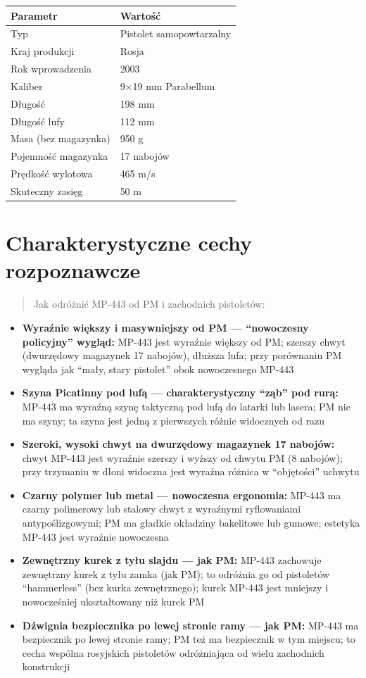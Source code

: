 \documentclass[12pt,openany,oneside]{book}
\providecommand{\tightlist}{%
  \setlength{\itemsep}{0pt}\setlength{\parskip}{0pt}}
\begin{document}
\begin{longtable}[]{@{}ll@{}}
\toprule\noalign{}
Parametr & Wartość \\
\midrule\noalign{}
\endhead
\bottomrule\noalign{}
\endlastfoot
Typ & Pistolet samopowtarzalny \\
Kraj produkcji & Rosja \\
Rok wprowadzenia & 2003 \\
Kaliber & 9×19 mm Parabellum \\
Długość & 198 mm \\
Długość lufy & 112 mm \\
Masa (bez magazynka) & 950 g \\
Pojemność magazynka & 17 nabojów \\
Prędkość wylotowa & 465 m/s \\
Skuteczny zasięg & 50 m \\
\end{longtable}

\section{Charakterystyczne cechy
rozpoznawcze}\label{charakterystyczne-cechy-rozpoznawcze-91}

\begin{quote}
Jak odróżnić MP-443 od PM i zachodnich pistoletów:
\end{quote}

\begin{itemize}
\tightlist
\item
  \textbf{Wyraźnie większy i masywniejszy od PM --- ``nowoczesny
  policyjny'' wygląd:} MP-443 jest wyraźnie większy od PM; szerszy chwyt
  (dwurzędowy magazynek 17 nabojów), dłuższa lufa; przy porównaniu PM
  wygląda jak ``mały, stary pistolet'' obok nowoczesnego MP-443
\item
  \textbf{Szyna Picatinny pod lufą --- charakterystyczny ``ząb'' pod
  rurą:} MP-443 ma wyraźną szynę taktyczną pod lufą do latarki lub
  lasera; PM nie ma szyny; ta szyna jest jedną z pierwszych różnic
  widocznych od razu
\item
  \textbf{Szeroki, wysoki chwyt na dwurzędowy magazynek 17 nabojów:}
  chwyt MP-443 jest wyraźnie szerszy i wyższy od chwytu PM (8 nabojów);
  przy trzymaniu w dłoni widoczna jest wyraźna różnica w ``objętości''
  uchwytu
\item
  \textbf{Czarny polymer lub metal --- nowoczesna ergonomia:} MP-443 ma
  czarny polimerowy lub stalowy chwyt z wyraźnymi ryflowaniami
  antypoślizgowymi; PM ma gładkie okładziny bakelitowe lub gumowe;
  estetyka MP-443 jest wyraźnie nowoczesna
\item
  \textbf{Zewnętrzny kurek z tyłu slajdu --- jak PM:} MP-443 zachowuje
  zewnętrzny kurek z tyłu zamka (jak PM); to odróżnia go od pistoletów
  ``hammerless'' (bez kurka zewnętrznego); kurek MP-443 jest mniejszy i
  nowocześniej ukształtowany niż kurek PM
\item
  \textbf{Dźwignia bezpiecznika po lewej stronie ramy --- jak PM:}
  MP-443 ma bezpiecznik po lewej stronie ramy; PM też ma bezpiecznik w
  tym miejscu; to cecha wspólna rosyjskich pistoletów odróżniająca od
  wielu zachodnich konstrukcji
\end{itemize}
\end{document}
